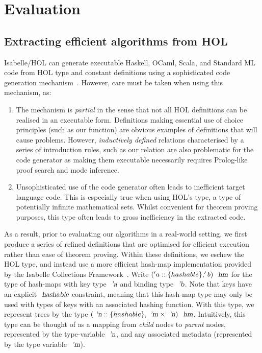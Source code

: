 \documentclass[sigconf]{acmart}
\begin{document}
\section{Evaluation}\label{sec:evaluation}

\subsection{Extracting efficient algorithms from HOL}

Isabelle/HOL can generate executable Haskell, OCaml, Scala, and Standard ML code from HOL type and constant definitions using a sophisticated code generation mechanism~\cite{XXX}.
However,  care must be taken when using this mechanism, as:
\begin{enumerate}
\item
The mechanism is \emph{partial} in the sense that not all HOL definitions can be realised in an executable form.
Definitions making essential use of choice principles (such as our  function) are obvious examples of definitions that will cause problems.
However, \emph{inductively defined} relations characterised by a series of introduction rules, such as our  relation are also problematic for the code generator as making them executable necessarily requires Prolog-like proof search and mode inference.
\item
Unsophisticated use of the code generator often leads to inefficient target language code.
This is especially true when using HOL's  type, a type of potentially infinite mathematical sets.
Whilst convenient for theorem proving purposes, this type often leads to gross inefficiency in the extracted code.
\end{enumerate}

As a result, prior to evaluating our algorithms in a real-world setting, we first produce a series of refined definitions that are optimised for efficient execution rather than ease of theorem proving.
Within these definitions, we eschew the HOL  type, and instead use a more efficient hash-map implementation provided by the Isabelle Collections Framework~\cite{XXX}.
Write $('a::\{hashable\}, 'b)\ \isa{hm}$ for the type of hash-maps with key type $\isa{'a}$ and binding type $\isa{'b}$.
Note that keys have an explicit $\isa{hashable}$ constraint, meaning that this hash-map type may only be used with types of keys with an associated hashing function.
With this type, we represent trees by the type $(\isa{'n}::\{hashable\}, \isa{'m} \times \isa{'n})\ \isa{hm}$.
Intuitively, this type can be thought of as a mapping from \emph{child} nodes to \emph{parent} nodes, represented by the type-variable $\isa{'n}$, and any associated metadata (represented by the type variable $\isa{'m}$).
\end{document}
